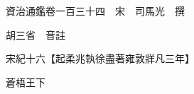 










 


 
 


 

  
  
  
  
  





  
  
  
  
  
 
  

  

  
  
  



  

 
 

  
   




  

  
  


  　　資治通鑑卷一百三十四　宋　司馬光　撰

　　胡三省　音註

　　宋紀十六【起柔兆執徐盡著雍敦牂凡三年】

　　蒼梧王下

